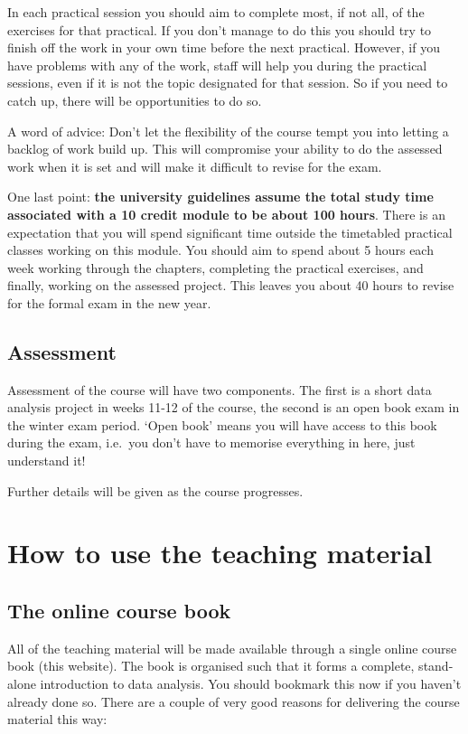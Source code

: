 \documentclass[]{book}
\begin{document}
In each practical session you should aim to complete most, if not all,
of the exercises for that practical. If you don't manage to do this you
should try to finish off the work in your own time before the next
practical. However, if you have problems with any of the work, staff
will help you during the practical sessions, even if it is not the topic
designated for that session. So if you need to catch up, there will be
opportunities to do so.

A word of advice: Don't let the flexibility of the course tempt you into
letting a backlog of work build up. This will compromise your ability to
do the assessed work when it is set and will make it difficult to revise
for the exam.

One last point: \textbf{the university guidelines assume the total study
time associated with a 10 credit module to be about 100 hours}. There is
an expectation that you will spend significant time outside the
timetabled practical classes working on this module. You should aim to
spend about 5 hours each week working through the chapters, completing
the practical exercises, and finally, working on the assessed project.
This leaves you about 40 hours to revise for the formal exam in the new
year.

\subsection{Assessment}\label{assessment}

Assessment of the course will have two components. The first is a short
data analysis project in weeks 11-12 of the course, the second is an
open book exam in the winter exam period. `Open book' means you will
have access to this book during the exam, i.e.~you don't have to
memorise everything in here, just understand it!

Further details will be given as the course progresses.

\section{How to use the teaching
material}\label{how-to-use-the-teaching-material}

\subsection{The online course book}\label{printed-material}

All of the teaching material will be made available through a single
online course book (this website). The book is organised such that it
forms a complete, stand-alone introduction to data analysis. You should
bookmark this now if you haven't already done so. There are a couple of
very good reasons for delivering the course material this way:
\end{document}

